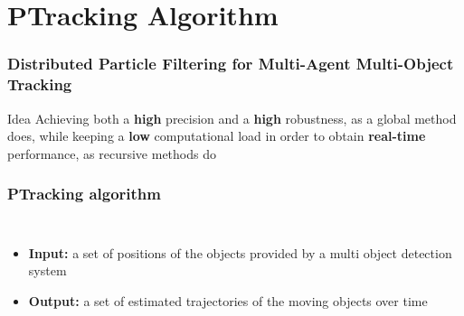 \section{PTracking Algorithm}

\begin{frame}
	\frametitle{Distributed Particle Filtering for Multi-Agent Multi-Object Tracking}
	
	\Large
	
	\begin{block}{Idea}
		Achieving both a \textbf{high} precision and a \textbf{high} robustness, as a
		global method does, while keeping a \textbf{low} computational load in order to
		obtain \textbf{real-time} performance, as recursive methods do
	\end{block}
\end{frame}

\begin{frame}
	\frametitle{PTracking algorithm}
	
	\begin{columns}[T]
		
		\vspace{0.8cm}
		
		\begin{itemize}
			\item \textbf{Input:} a set of positions of the objects provided by a multi object
				  detection system
			
			\vspace{1.6cm}
			
			\item \textbf{Output:} a set of estimated trajectories of the moving objects over
				  time
		\end{itemize}
		
		\centering
		
	\end{columns}
\end{frame}


